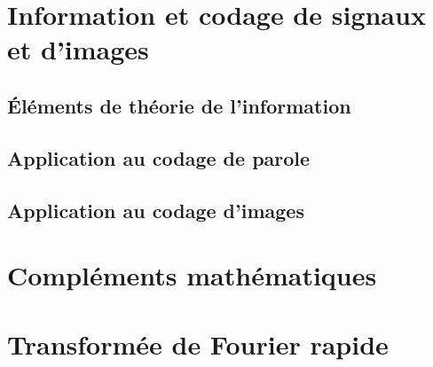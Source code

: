 \documentclass[graybox,envcountchap,envcountsame,sectrefs]{svmono}
\begin{document}
\part{Information et codage de signaux et d'images}
\chapter{\'El\'ements de th\'eorie de l'information}
\label{info-chap}

\chapter{Application au codage de parole}



\chapter{Application au codage d'images}


\appendix
\part{Compl\'ements math\'ematiques}

\part{Transformée de Fourier rapide}

\end{document}

